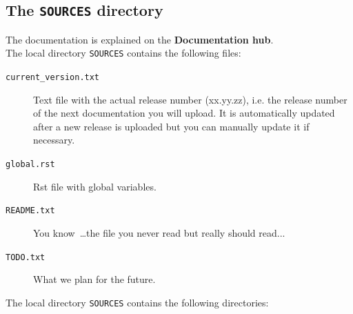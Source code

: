\documentclass[a4paper,10pt]{article}
\newcommand{\code}[1]{\texttt{#1}}
\newcommand{\dhub}{{\bf Documentation hub}}
\begin{document}
\subsection{The \code{SOURCES} directory}
\label{doc_content}

The documentation is explained on the \dhub.\\

The local directory \code{SOURCES} contains the following files:

\begin{description}
 \item[\code{current\_version.txt}] Text file with the actual release number (xx.yy.zz), i.e. the release number of the next documentation you will upload. It is automatically updated after a new release is uploaded but you can manually update it
if necessary.
 \item[\code{global.rst}] Rst file with global variables.
 \item[\code{README.txt}] You know~\ldots the file you never read but really should read...
 \item[\code{TODO.txt}] What we plan for the future.
\end{description}

The local directory \code{SOURCES} contains the following directories:
\end{document}
